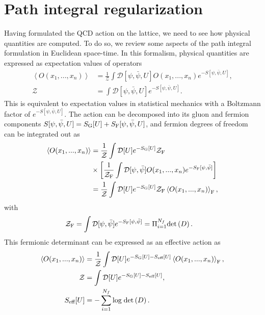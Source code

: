 \section{Path integral regularization}
\label{ch_foundation:sec:path}

Having formulated the QCD action on the lattice, we need to see how physical quantities are computed. To do so, we review some aspects of the path integral formulation in Euclidean space-time. In this formalism, physical quantities are expressed as expectation values of operators
\begin{align}
\left<{O}(x_1,...,x_n)\right>&=\frac{1}{\mathcal{Z}}\int\mathcal{D}[\psi,\bar{\psi},U]{O}(x_1,...,x_n)e^{-S[\psi,\bar{\psi},U]}, \\
\mathcal{Z}&=\int\mathcal{D}[\psi,\bar{\psi},U]e^{-S[\psi,\bar{\psi},U]}.
\end{align}
This is equivalent to expectation values in statistical mechanics with a Boltzmann factor of $e^{-S[\psi,\bar{\psi},U]}$. The action can be decomposed into its gluon and fermion components $S[\psi,\bar{\psi},U]=S_{\textrm G}[U]+S_{\textrm F}[\psi,\bar{\psi},U]$, and fermion degrees of freedom can be integrated out as
\begin{align}
\left<{O}(x_1,...,x_n)\right>&=\frac{1}{\mathcal{Z}}\int\mathcal{D}[U]e^{-S_{\textrm G}[U]}\mathcal{Z}_{\textrm F}\notag \\
&\times\left[\frac{1}{\mathcal{Z}_{\textrm F}}\int\mathcal{D}[\psi,\bar{\psi}]{O}(x_1,...,x_n)e^{-S_{\textrm F}[\psi,\bar{\psi}]}\right] \\
&=\frac{1}{\mathcal{Z}}\int\mathcal{D}[U]e^{-S_{\textrm G}[U]}\mathcal{Z}_{\textrm F}\left<{O}(x_1,...,x_n)\right>_{\textrm F},
\end{align}
with 
\begin{align}
\mathcal{Z}_{\textrm F}&=\int\mathcal{D}[\psi,\bar{\psi}]e^{-S_{\textrm F}[\psi,\bar{\psi}]}=\Pi_{i=1}^{N_f}{\textrm{det}}\left(D\right).
\end{align}
This fermionic determinant can be expressed as an effective action as
\begin{align}
\left<{O}(x_1,...,x_n)\right>&=\frac{1}{\mathcal{Z}}\int\mathcal{D}[U]e^{-S_{\textrm G}[U]-S_{\textrm{eff}}[U]}\left<{O}(x_1,...,x_n)\right>_{\textrm F}, \\
\mathcal{Z}&=\int\mathcal{D}[U]e^{-S_{\textrm G}[U]-S_{\textrm{eff}}[U]}, \\
S_{\textrm{eff}}[U]&=-\sum_{i=1}^{N_f}{\textrm{log}}\;{\textrm{det}}\left(D\right).
\end{align}

